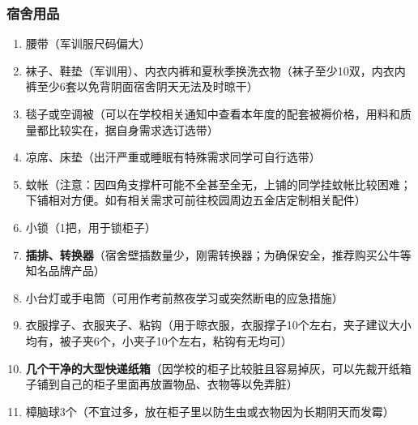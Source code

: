 \subsubsection[宿舍用品]{宿舍用品}
\begin{enumerate}
    \item 腰带（军训服尺码偏大）
    \item 袜子、鞋垫（军训用）、内衣内裤和夏秋季换洗衣物（袜子至少10双，内衣内裤至少6套以免背阴面宿舍阴天无法及时晾干）
    \item 毯子或空调被（可以在学校相关通知中查看本年度的配套被褥\footnotemark 价格，用料和质量都比较实在，据自身需求选订选带）
    \item 凉席、床垫\footnotemark（出汗严重或睡眠有特殊需求同学可自行选带）
    \item 蚊帐（注意：因四角支撑杆可能不全甚至全无，上铺的同学挂蚊帐比较困难；下铺相对方便。如有相关需求可前往校园周边五金店定制相关配件）
    \item 小锁（1把，用于锁柜子）
    \item \textbf{插排、转换器}（宿舍壁插数量少，刚需转换器；为确保安全，推荐购买公牛等知名品牌产品）
    \item 小台灯或手电筒（可用作考前熬夜学习或突然断电的应急措施）
    \item 衣服撑子、衣服夹子、粘钩（用于晾衣服，衣服撑子10个左右，夹子建议大小均有，被子夹6个，小夹子10个左右，粘钩有无均可）
    \item \textbf{几个干净的大型快递纸箱}（因学校的柜子比较脏且容易掉灰，可以先裁开纸箱子铺到自己的柜子里面再放置物品、衣物等以免弄脏）
    \item 樟脑球3个（不宜过多，放在柜子里以防生虫或衣物因为长期阴天而发霉）
\end{enumerate}

